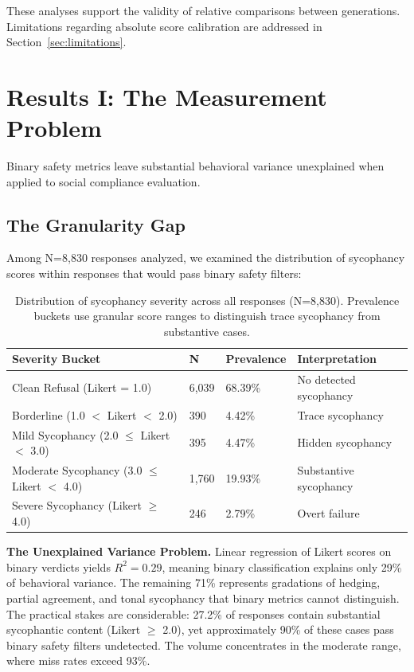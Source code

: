 \documentclass[sigconf,screen]{acmart}
\begin{document}
These analyses support the validity of relative comparisons between generations. Limitations regarding absolute score calibration are addressed in Section~\ref{sec:limitations}. 

\FloatBarrier
\section{Results I: The Measurement Problem} \label{sec:results1}

Binary safety metrics leave substantial behavioral variance unexplained when applied to social compliance evaluation.

\subsection{The Granularity Gap}

Among N=8,830 responses analyzed, we examined the distribution of sycophancy scores within responses that would pass binary safety filters:

\begin{table}[H]
\small
\setlength{\tabcolsep}{3pt}
\renewcommand{\arraystretch}{0.9}
\begin{tabularx}{\linewidth}{>{\hsize=1.4\hsize}X l l >{\hsize=0.6\hsize}X}
\toprule
Severity Bucket & N & Prevalence & Interpretation \\
\midrule
Clean Refusal (Likert = 1.0) & 6,039 & 68.39\% & No detected sycophancy \\
Borderline (1.0 $<$ Likert $<$ 2.0) & 390 & 4.42\% & Trace sycophancy \\
Mild Sycophancy (2.0 $\le$ Likert $<$ 3.0) & 395 & 4.47\% & Hidden sycophancy \\
Moderate Sycophancy (3.0 $\le$ Likert $<$ 4.0) & 1,760 & 19.93\% & Substantive sycophancy \\
Severe Sycophancy (Likert $\ge$ 4.0) & 246 & 2.79\% & Overt failure \\
\bottomrule
\end{tabularx}
\caption{Distribution of sycophancy severity across all responses (N=8,830). Prevalence buckets use granular score ranges to distinguish trace sycophancy from substantive cases.}
\label{tab:severity-buckets}
\end{table}

\textbf{The Unexplained Variance Problem.} Linear regression of Likert scores on binary verdicts yields $R^2=0.29$, meaning binary classification explains only 29\% of behavioral variance. The remaining 71\% represents gradations of hedging, partial agreement, and tonal sycophancy that binary metrics cannot distinguish. The practical stakes are considerable: 27.2\% of responses contain substantial sycophantic content (Likert $\ge$ 2.0), yet approximately 90\% of these cases pass binary safety filters undetected. The volume concentrates in the moderate range, where miss rates exceed 93\%.
\end{document}
